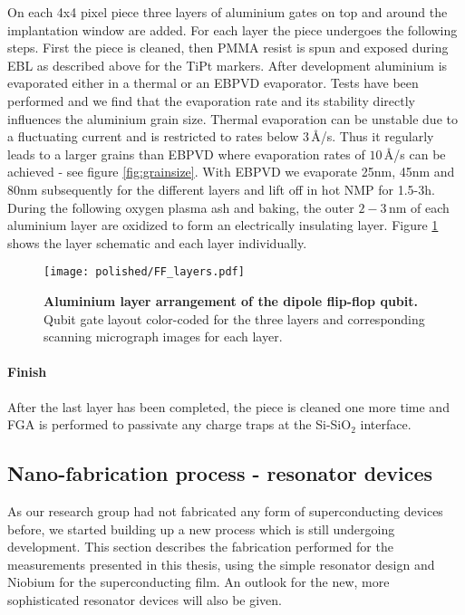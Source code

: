 On each 4x4 pixel piece three layers of aluminium gates on top and around the implantation window are added. For each layer the piece undergoes the following steps. 
First the piece is cleaned, then PMMA resist is spun and exposed during EBL as described above for the TiPt markers. After development aluminium is evaporated either in a thermal or an EBPVD evaporator. Tests have been performed and we find that the evaporation rate and its stability directly influences the aluminium grain size. Thermal evaporation can be unstable due to a fluctuating current and is restricted to rates below $3\,$\AA/s. Thus it regularly leads to a larger grains than EBPVD where evaporation rates of $10\,$\AA/s can be achieved - see figure \ref{fig:grainsize}. With EBPVD we evaporate 25nm, 45nm and 80nm subsequently for the different layers and lift off in hot NMP for 1.5-3h. During the following oxygen plasma ash and baking, the outer $2-3\,$nm of each aluminium layer are oxidized to form an electrically insulating layer. Figure \ref{fig:ff_layers} shows the layer schematic and each layer individually. 

\begin{figure}
	\centering
	\texttt{[image: polished/FF\_layers.pdf]}
	\caption[Aluminium layer arrangement of the dipole flip-flop qubit]{\textbf{Aluminium layer arrangement of the dipole flip-flop qubit.} Qubit gate layout color-coded for the three layers and corresponding scanning micrograph images for each layer.}
	\label{fig:ff_layers}
\end{figure}

\paragraph*{Finish}
After the last layer has been completed, the piece is cleaned one more time and FGA is performed to passivate any charge traps at the Si-SiO$_2$ interface\cite{Brower1988}.

\subsection{Nano-fabrication process - resonator devices} \label{sec:fab_cpwr}

As our research group had not fabricated any form of superconducting devices before, we started building up a new process which is still undergoing development. This section describes the fabrication performed for the measurements presented in this thesis, using the simple resonator design and Niobium for the superconducting film. An outlook for the new, more sophisticated resonator devices will also be given. 

